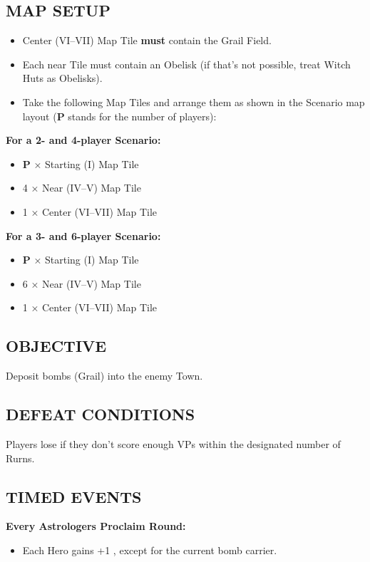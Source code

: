 \begin{multicols}{2}
\subsection*{\MakeUppercase{Map Setup}}
\begin{itemize}
  \item Center (VI--VII) Map Tile \textbf{must} contain the Grail Field.
  \item Each near Tile must contain an Obelisk (if that's not possible, treat Witch Huts as Obelisks).
  \item Take the following Map Tiles and arrange them as shown in the Scenario map layout ($\boldsymbol{P}$ stands for the number of players):
\end{itemize}

\textbf{For a 2- and 4-player Scenario:}
\begin{itemize}
  \item $\boldsymbol{P}$ × Starting (I) Map Tile
  \item 4 × Near (IV--V) Map Tile
  \item 1 × Center (VI--VII) Map Tile
\end{itemize}

\textbf{For a 3- and 6-player Scenario:}
\begin{itemize}
  \item $\boldsymbol{P}$ × Starting (I) Map Tile
  \item 6 × Near (IV--V) Map Tile
  \item 1 × Center (VI--VII) Map Tile
\end{itemize}

\subsection*{\MakeUppercase{Objective}}
Deposit bombs (Grail) into the enemy Town.

\subsection*{\MakeUppercase{Defeat Conditions}}
Players lose if they don't score enough VPs within the designated number of Rurns.

\subsection*{\MakeUppercase{Timed Events}}

\textbf{Every Astrologers Proclaim Round:}
\begin{itemize}
  \item Each Hero gains +1 , except for the current bomb carrier.
\end{itemize}


\end{multicols}
